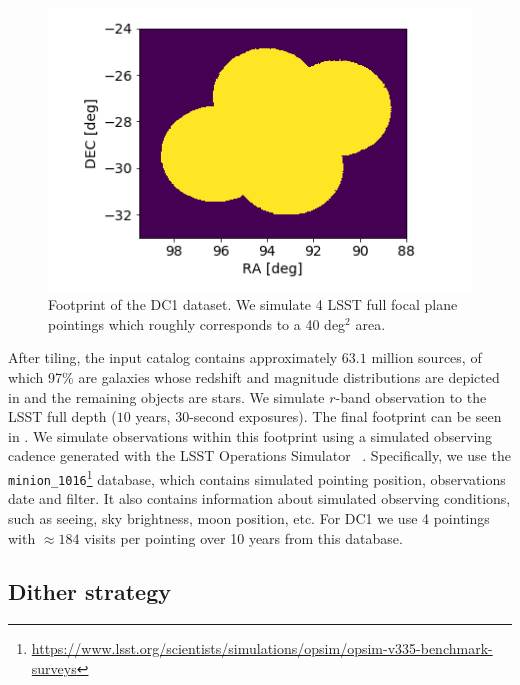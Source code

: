 \documentclass[\docopts]{\docclass}
\begin{document}
\begin{figure}
\centering
\includegraphics[width=0.9\columnwidth]{footprint.png}
\caption{Footprint of the DC1 dataset. We simulate 4 LSST full focal plane pointings which roughly corresponds to a 40 deg$^{2}$ area.}
\label{fig:footprint}
\end{figure}

After tiling, the input catalog contains approximately $63.1$ million sources, of which 97\% are galaxies whose redshift and magnitude distributions are depicted in  and the remaining objects are stars. We simulate $r$-band observation to the LSST full depth ($10$ years, 30-second exposures). The final footprint can be seen in . We simulate observations within this footprint using a simulated observing cadence generated with the LSST Operations Simulator~ \citep[OpSim]{2014SPIE.9150E..15D}. Specifically, we use the \texttt{minion\_1016}\footnote{\url{https://www.lsst.org/scientists/simulations/opsim/opsim-v335-benchmark-surveys}} database, which contains simulated pointing position, observations date and filter. It also contains information about simulated observing conditions, such as seeing, sky brightness, moon position, etc. For DC1 we use 4 pointings with $\approx 184$ visits per pointing over 10 years from this database.

\subsection{Dither strategy}
\label{sec:dithering}
\end{document}
